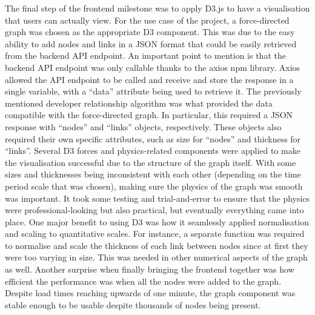The final step of the frontend milestone was to apply D3.js to have a visualisation that users can actually view.
For the use case of the project, a force-directed graph was chosen as the appropriate D3 component.
This was due to the easy ability to add nodes and links in a JSON format that could be easily retrieved from the backend API endpoint.
An important point to mention is that the backend API endpoint was only callable thanks to the axios npm library.
Axios allowed the API endpoint to be called and receive and store the response in a single variable, with a ``data'' attribute being used to retrieve it.
The previously mentioned developer relationship algorithm was what provided the data compatible with the force-directed graph.
In particular, this required a JSON response with ``nodes'' and ``links'' objects, respectively.
These objects also required their own specific attributes, such as size for ``nodes'' and thickness for ``links''.
Several D3 forces and physics-related components were applied to make the visualisation successful due to the structure of the graph itself.
With some sizes and thicknesses being inconsistent with each other (depending on the time period scale that was chosen), making sure the physics of the graph was smooth was important.
It took some testing and trial-and-error to ensure that the physics were professional-looking but also practical, but eventually everything came into place.
One major benefit to using D3 was how it seamlessly applied normalisation and scaling to quantitative scales.
For instance, a separate function was required to normalise and scale the thickness of each link between nodes since at first they were too varying in size.
This was needed in other numerical aspects of the graph as well.
Another surprise when finally bringing the frontend together was how efficient the performance was when all the nodes were added to the graph.
Despite load times reaching upwards of one minute, the graph component was stable enough to be usable despite thousands of nodes being present.